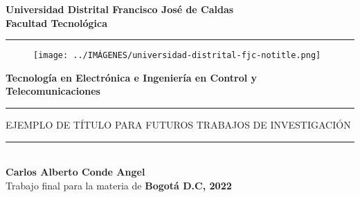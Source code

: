 \begin{titlepage}
	\begin{center}
		{\LARGE \textbf{Universidad Distrital Francisco José de Caldas}}\\
		\vspace{3mm}
		\Large{\textbf{Facultad Tecnológica}}
		\textcolor{darktan}{\rule{\linewidth}{0.40mm}}
		\begin{figure}[H]
			\centering
			\texttt{[image: ../IMÁGENES/universidad-distrital-fjc-notitle.png]} 
		\end{figure}
		{\large \textbf{Tecnología en Electrónica e Ingeniería en Control y Telecomunicaciones}}
		\vspace{3.5mm}
		\textcolor{darktan}{\rule{\linewidth}{0.70mm}}
		\Large{\uppercase{Ejemplo de título para futuros trabajos de investigación}}
		\textcolor{darktan}{\rule{\linewidth}{0.70mm}}
		\vspace{6mm}\\
		\LARGE{\textbf{Carlos Alberto Conde Angel}}\\
		\vspace{5mm}
		Trabajo final para la materia de 	
		\vfill
		\LARGE{\textbf{Bogotá D.C, 2022}}
	\end{center}
\end{titlepage}